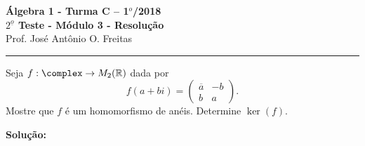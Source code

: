 \documentclass[12pt]{article}
\begin{document}


\begin{center}
{\Large\bf {\'A}lgebra 1 - Turma C -- 1$^{o}$/2018} \\ \vspace{9pt} {\large\bf
  $2^{\underline{o}}$ Teste - Módulo 3 - Resolu\c{c}\~ao}\\
\vspace{9pt} Prof. Jos{\'e} Ant{\^o}nio O. Freitas
\end{center}
\hrule

\vspace{.6cm}

\questao Seja $f : \complex \to M_2(\real)$ dada por
\[
	f(a + bi) = \begin{pmatrix}
		\overline{a} & -b\\
		b & a
	\end{pmatrix}.
\]
Mostre que $f$ é um homomorfismo de anéis. Determine $\ker(f)$.

\noindent\textbf{Solu\c{c}\~ao:}
\end{document}
